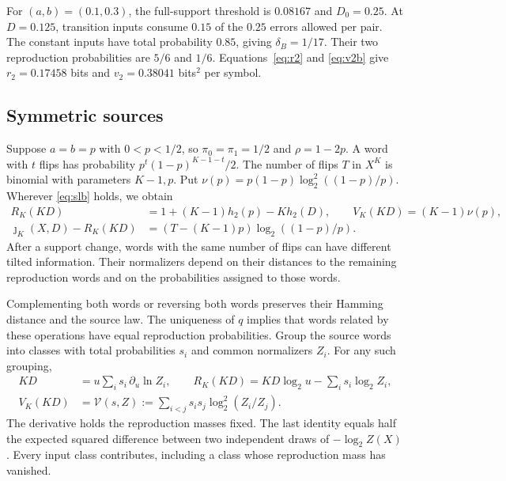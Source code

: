 \documentclass[11pt,letterpaper]{article}
\theoremstyle{definition}
\newcommand{\jj}{\jmath}
\newcommand{\Vfun}{\mathcal V}
\newcommand{\hx}{h_2}
\begin{document}
For $(a,b)=(0.1,0.3)$, the full-support threshold is $0.08167$ and $D_0=0.25$. At $D=0.125$, transition inputs consume $0.15$ of the $0.25$ errors allowed per pair. The constant inputs have total probability $0.85$, giving $\delta_B=1/17$. Their two reproduction probabilities are $5/6$ and $1/6$. Equations~\eqref{eq:r2} and \eqref{eq:v2b} give $r_2=0.17458$ bits and $v_2=0.38041$ bits$^2$ per symbol.

\subsection{Symmetric sources}\label{sec:sym}
Suppose $a=b=p$ with $0<p<1/2$, so $\pi_0=\pi_1=1/2$ and $\rho=1-2p$. A word with $t$ flips has probability $p^t(1-p)^{K-1-t}/2$. The number of flips $T$ in $X^K$ is binomial with parameters $K-1,p$. Put $\nu(p)=p(1-p)\log_2^2((1-p)/p)$. Wherever \eqref{eq:slb} holds, we obtain
\begin{align}
 R_K(KD)&=1+(K-1)\hx(p)-K\hx(D),\qquad V_K(KD)=(K-1)\nu(p),\label{eq:lowp}\\
 \jj_K(X,D)-R_K(KD)&=(T-(K-1)p)\log_2((1-p)/p).               \label{eq:bin}
\end{align}
After a support change, words with the same number of flips can have different tilted information. Their normalizers depend on their distances to the remaining reproduction words and on the probabilities assigned to those words.

Complementing both words or reversing both words preserves their Hamming distance and the source law. The uniqueness of $q$ implies that words related by these operations have equal reproduction probabilities. Group the source words into classes with total probabilities $s_i$ and common normalizers $Z_i$. For any such grouping,
\begin{align}
 KD&=u\sum_i s_i\,\partial_u\ln Z_i,\qquad
 R_K(KD)=KD\log_2u-\sum_i s_i\log_2Z_i,                        \label{eq:class}\\
 V_K(KD)&=\Vfun(s,Z):=\sum_{i<j}s_i s_j\log_2^2(Z_i/Z_j).       \label{eq:pairvar}
\end{align}
The derivative holds the reproduction masses fixed. The last identity equals half the expected squared difference between two independent draws of $-\log_2 Z(X)$. Every input class contributes, including a class whose reproduction mass has vanished.
\end{document}
